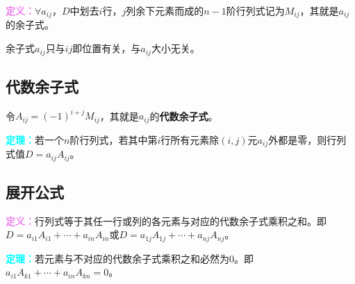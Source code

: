 \documentclass[UTF8, 12pt]{ctexart}
\begin{document}
\textcolor{violet}{\textbf{定义：}}$\forall a_{ij}$，$D$中划去$i$行，$j$列余下元素而成的$n-1$阶行列式记为$M_{ij}$，其就是$a_{ij}$的余子式。

余子式$a_{ij}$只与$ij$即位置有关，与$a_{ij}$大小无关。

\subsection{代数余子式}

令$A_{ij}=(-1)^{i+j}M_{ij}$，其就是$a_{ij}$的\textbf{代数余子式}。

\textcolor{aqua}{\textbf{定理：}}若一个$n$阶行列式，若其中第$i$行所有元素除$(i,j)$元$a_{ij}$外都是零，则行列式值$D=a_{ij}A_{ij}$。

\subsection{展开公式}

\textcolor{violet}{\textbf{定义：}}行列式等于其任一行或列的各元素与对应的代数余子式乘积之和。即$D=a_{i1}A_{i1}+\cdots+a_{in}A_{in}$或$D=a_{1j}A_{1j}+\cdots+a_{nj}A_{nj}$。

\textcolor{aqua}{\textbf{定理：}}若元素与不对应的代数余子式乘积之和必然为0。即$a_{i1}A_{k1}+\cdots+a_{in}A_{kn}=0$。
\end{document}
